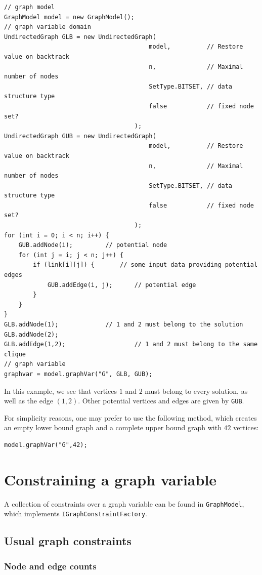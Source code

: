 \documentclass{article}
\begin{document}
\begin{lstlisting}
// graph model 
GraphModel model = new GraphModel();
// graph variable domain
UndirectedGraph GLB = new UndirectedGraph(
										model,			// Restore value on backtrack
										n,				// Maximal number of nodes
										SetType.BITSET,	// data structure type
										false			// fixed node set?
									);
UndirectedGraph GUB = new UndirectedGraph(
										model,			// Restore value on backtrack
										n,				// Maximal number of nodes
										SetType.BITSET,	// data structure type
										false			// fixed node set?
									);
for (int i = 0; i < n; i++) {
	GUB.addNode(i);			// potential node
	for (int j = i; j < n; j++) {
		if (link[i][j]) {       // some input data providing potential edges
			GUB.addEdge(i, j);		// potential edge
		}
	}
}
GLB.addNode(1);				// 1 and 2 must belong to the solution
GLB.addNode(2);
GLB.addEdge(1,2);					// 1 and 2 must belong to the same clique
// graph variable
graphvar = model.graphVar("G", GLB, GUB);
\end{lstlisting}

In this example, we see that vertices $1$ and $2$ must belong to every solution, as well as the edge $(1,2)$. 
Other potential vertices and edges are given by \texttt{GUB}. 

For simplicity reasons, one may prefer to use the following method, which creates an empty lower bound graph and a complete upper bound graph with $42$ vertices:
\begin{lstlisting}
model.graphVar("G",42);
\end{lstlisting}

\newpage{}
\section{Constraining a graph variable}

A collection of constraints over a graph variable can be found in \texttt{GraphModel}, which implements \texttt{IGraphConstraintFactory}. 

\subsection{Usual graph constraints}

\subsubsection{Node and edge counts}
\end{document}
